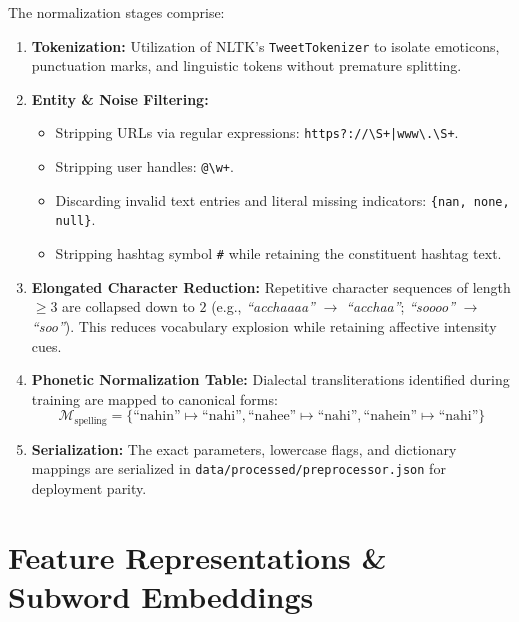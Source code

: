 \documentclass[11pt,a4paper]{article}
\begin{document}
The normalization stages comprise:
\begin{enumerate}
    \item \textbf{Tokenization:} Utilization of NLTK's \texttt{TweetTokenizer} to isolate emoticons, punctuation marks, and linguistic tokens without premature splitting.
    \item \textbf{Entity \& Noise Filtering:}
    \begin{itemize}
        \item Stripping URLs via regular expressions: \texttt{https?://\textbackslash S+|www\textbackslash.\textbackslash S+}.
        \item Stripping user handles: \texttt{@\textbackslash w+}.
        \item Discarding invalid text entries and literal missing indicators: \texttt{\{nan, none, null\}}.
        \item Stripping hashtag symbol \texttt{\#} while retaining the constituent hashtag text.
    \end{itemize}
    \item \textbf{Elongated Character Reduction:} Repetitive character sequences of length $\ge 3$ are collapsed down to $2$ (e.g., \textit{``acchaaaa''} $\rightarrow$ \textit{``acchaa''}; \textit{``soooo''} $\rightarrow$ \textit{``soo''}). This reduces vocabulary explosion while retaining affective intensity cues.
    \item \textbf{Phonetic Normalization Table:} Dialectal transliterations identified during training are mapped to canonical forms:
    \begin{equation}
        \mathcal{M}_{\text{spelling}} = \{\text{``nahin''} \mapsto \text{``nahi''}, \text{``nahee''} \mapsto \text{``nahi''}, \text{``nahein''} \mapsto \text{``nahi''}\}
    \end{equation}
    \item \textbf{Serialization:} The exact parameters, lowercase flags, and dictionary mappings are serialized in \texttt{data/processed/preprocessor.json} for deployment parity.
\end{enumerate}

\section{Feature Representations \& Subword Embeddings}
\end{document}
